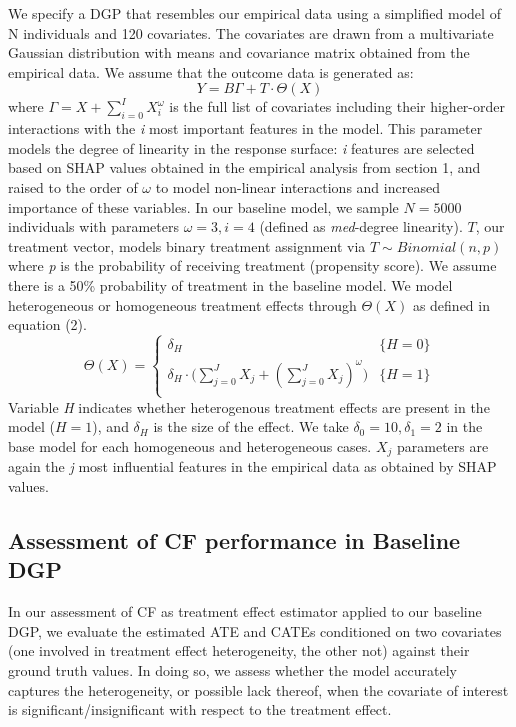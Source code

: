 \documentclass[12pt]{article}
\begin{document}
We specify a DGP that resembles our empirical data using a simplified model of N individuals and 120 covariates. The covariates are drawn from a multivariate Gaussian distribution with means and covariance matrix obtained from the empirical data. We assume that the outcome data is generated as: 
\[ Y = B \Gamma + T  \cdot \Theta(X) \tag{1} \label{eq:special}\]
where $\Gamma = X + \sum_{i = 0}^{I} X_i^\omega$ is the full list of covariates including their higher-order interactions with the \textit{i} most important features in the model. This parameter models the degree of linearity in the response surface: \textit{i} features are selected based on SHAP values obtained in the empirical analysis from section 1, and raised to the order of $\omega$ to model non-linear interactions and increased importance of these variables. In our baseline model, we sample $N=5000$ individuals with parameters $\omega = 3, i = 4$ (defined as \textit{med}-degree linearity). $T$, our treatment vector, models binary treatment assignment via $ T \sim Binomial(n,p)$ where \textit{p} is the probability of receiving treatment (propensity score). We assume there is a 50\% probability of treatment in the baseline model. We model heterogeneous or homogeneous treatment effects through $\Theta(X)$ as defined in equation (2). 
\[
\Theta(X) =  \begin{cases} 
	 \delta_H & {\{H = 0\}} \\ 
	 \delta_H \cdot \big( \sum_{j = 0}^{J} X_j + (\sum_{j = 0}^{J} X_j )^\omega ) & \{ H = 1 \} \\ 
\end{cases} \tag{2} \label{eq:special} \]
Variable \textit{H} indicates whether heterogenous treatment effects are present in the model ($H = 1$), and $\delta_H$ is the size of the effect. We take $\delta_0 = 10, \delta_1 = 2$ in the base model for each homogeneous and heterogeneous cases. $X_j$ parameters are again the \textit{j} most influential features in the empirical data as obtained by SHAP values. \\

\subsection{Assessment of CF performance in Baseline DGP} 

In our assessment of CF as treatment effect estimator applied to our baseline
DGP, we evaluate the estimated ATE and CATEs conditioned on two covariates (one
involved in treatment effect heterogeneity, the other not) against their ground
truth values. In doing so, we assess whether the model accurately captures the
heterogeneity, or possible lack thereof, when the covariate of interest is
significant/insignificant with respect to the treatment effect. \\
\end{document}
